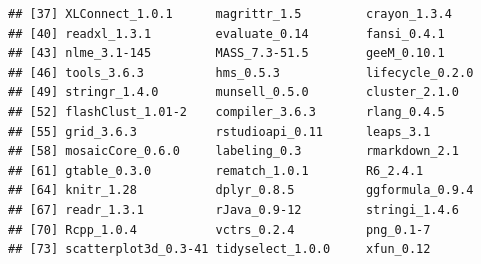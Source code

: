 \documentclass[
]{krantz}
\begin{document}
\begin{verbatim}
## [37] XLConnect_1.0.1      magrittr_1.5         crayon_1.3.4        
## [40] readxl_1.3.1         evaluate_0.14        fansi_0.4.1         
## [43] nlme_3.1-145         MASS_7.3-51.5        geeM_0.10.1         
## [46] tools_3.6.3          hms_0.5.3            lifecycle_0.2.0     
## [49] stringr_1.4.0        munsell_0.5.0        cluster_2.1.0       
## [52] flashClust_1.01-2    compiler_3.6.3       rlang_0.4.5         
## [55] grid_3.6.3           rstudioapi_0.11      leaps_3.1           
## [58] mosaicCore_0.6.0     labeling_0.3         rmarkdown_2.1       
## [61] gtable_0.3.0         rematch_1.0.1        R6_2.4.1            
## [64] knitr_1.28           dplyr_0.8.5          ggformula_0.9.4     
## [67] readr_1.3.1          rJava_0.9-12         stringi_1.4.6       
## [70] Rcpp_1.0.4           vctrs_0.2.4          png_0.1-7           
## [73] scatterplot3d_0.3-41 tidyselect_1.0.0     xfun_0.12
\end{verbatim}

\cleardoublepage

  

\backmatter
\printindex
\end{document}
